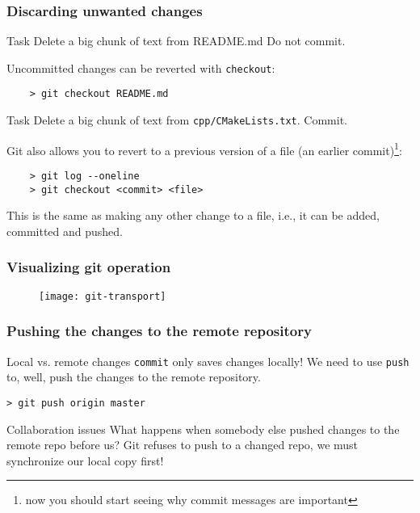 \begin{frame}[fragile]
	\frametitle{Discarding unwanted changes}
	
	\begin{block}{Task}
	Delete a big chunk of text from README.md Do not commit.	
	\end{block}
	
	Uncommitted changes can be reverted with \texttt{checkout}:
	\begin{verbatim}
	> git checkout README.md
	\end{verbatim}
	
	\begin{block}{Task}
	Delete a big chunk of text from \texttt{cpp/CMakeLists.txt}. Commit.
	\end{block}
	
	Git also allows you to revert to a previous version of a file (an earlier commit)\footnote{now you should start seeing why commit messages are important}:
	\begin{verbatim}
	> git log --oneline
	> git checkout <commit> <file>
	\end{verbatim}
	This is the same as making any other change to a file, i.e., it can be added, committed and pushed.
\end{frame}


\begin{frame}[fragile]
	\frametitle{Visualizing git operation}
	
	\begin{figure}
		\texttt{[image: git-transport]}
	\end{figure}
\end{frame}


\begin{frame}[fragile]
	\frametitle{Pushing the changes to the remote repository}
	
	\begin{block}{Local vs. remote changes}
	\texttt{commit} only saves changes \alert{locally}! We need to use \texttt{push} to, well, push the changes to the remote repository. 
	
	\begin{verbatim}
> git push origin master
	\end{verbatim}
	\end{block}

	\begin{block}{Collaboration issues}
What happens when somebody else pushed changes to the remote repo before us? Git refuses to push to a changed repo, we must synchronize our local copy first!
	\end{block}	
	
\end{frame}

